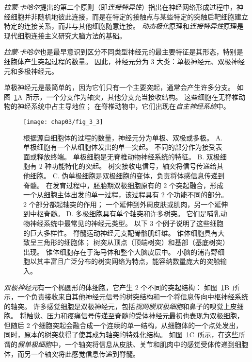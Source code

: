 \textit{拉蒙$\cdot$卡哈尔}提出的第二个原则（即\textit{连接特异性}）指出在神经网络形成过程中，神经细胞并非随机地彼此连接，而是在特定的接触点与某些特定的突触后靶细胞建立特定的连接关系，而非与其他细胞随意连接。
\textit{动态极化}原理和\textit{连接特异性}原理是现代细胞连接主义研究大脑方法的基础。


\textit{拉蒙$\cdot$卡哈尔}也是最早意识到区分不同类型神经元的最主要特征是其形态，特别是细胞体产生突起过程的数量。 
因此，神经元分为 3 大类：单极神经元、双极神经元和多极神经元。


单极神经元是最简单的，因为它们只有一个主要突起，通常会产生许多分支。
如图~\ref{fig:3_3}A~所示，一个分支作为轴突，其他分支充当接收结构。
这些细胞在无脊椎动物的神经系统中占主导地位；
在脊椎动物中，它们出现在\textit{自主神经系统}中。


\begin{figure}[htbp]
	\centering
	\texttt{[image: chap03/fig\_3\_3]}
	\caption{根据源自细胞体的过程的数量，神经元分为单极、双极或多极。 
		A. 单极细胞有一个从细胞体发出的单一突起。
		不同的部分作为接受表面或释放终端。
		单极细胞是无脊椎动物神经系统的特征。 
		B. 双极细胞有 2 种功能特化的突起。
		树突接收电信号，轴突将信号传递给其他细胞。
		C. 伪单极细胞是双极细胞的变体，负责将体感信息传递到脊髓。
		在发育过程中，胚胎期双极细胞原有的 2 个突起融合，形成一个从细胞主体出发的单一过程，该过程具有 2 个功能不同的部分。
		 2 个部分都起轴突的作用；
		一个延伸到外周皮肤或肌肉，另一个延伸到中枢脊髓\cite{ross2006histology}。
		D. 多极细胞具有单个轴突和许多树突。 
		它们是哺乳动物神经系统中最常见的神经元类型。 
		以下 3 个例子说明了这些细胞的巨大多样性。
		脊髓运动神经元支配骨骼肌纤维。
		锥体细胞具有大致呈三角形的细胞体；
		树突从顶点（顶端树突）和基部（基底树突）出现。 
		锥体细胞存在于海马体和整个大脑皮层中。 
	小脑的浦肯野细胞以其丰富且广泛分布的树突网络为特点，能容纳数量庞大的突触输入\cite{ross2006histology}。}
	\label{fig:3_3}
\end{figure}


\textit{双极神经元}有一个椭圆形的体细胞，它产生 2 个不同的突起结构：
如图~\ref{fig:3_3}B~所示，一个负责接收来自其他神经元信号的树突结构和一个将信息传向中枢神经系统的轴突。
许多感觉细胞是双极神经元，包括\textit{视网膜双极细胞}和鼻子的嗅觉上皮细胞。
将触觉、压力和疼痛信号传递至脊髓的受体神经元最初也表现为双极细胞，但随后 2 个细胞突起会融合成一个连续的单一结构，从细胞体的一个点处发出，同时，原本的树突获得了使其成为轴突的特殊化结构。
如图~\ref{fig:3_3}C~所示，在这些所谓的\textit{假单极细胞}中，一个轴突将信息从皮肤、关节和肌肉中的感觉受体传递到细胞体，而另一个轴突将此感觉信息传递到脊髓。


